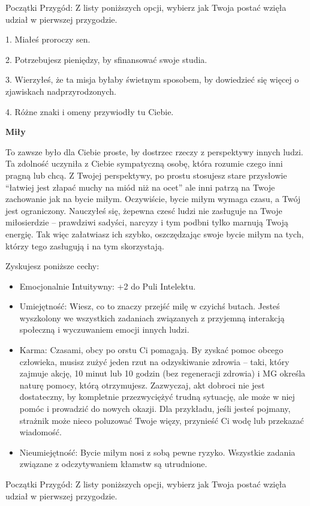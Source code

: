 Początki Przygód: Z listy poniższych opcji, wybierz jak Twoja postać wzięła udział w pierwszej przygodzie.

1. Miałeś proroczy sen.

2. Potrzebujesz pieniędzy, by sfinansować swoje studia.

3. Wierzyłeś, że ta misja byłaby świetnym sposobem, by dowiedzieć się więcej o zjawiskach nadprzyrodzonych.

4. Różne znaki i omeny przywiodły tu Ciebie.

\textbf{Miły}

To zawsze było dla Ciebie proste, by dostrzec rzeczy z perspektywy innych ludzi. Ta zdolność uczyniła z Ciebie sympatyczną osobę, która rozumie czego inni pragną lub chcą. Z Twojej perspektywy, po prostu stosujesz stare przysłowie “łatwiej jest złapać muchy na miód niż na ocet” ale inni patrzą na Twoje zachowanie jak na bycie miłym. Oczywiście, bycie miłym wymaga czasu, a Twój jest ograniczony. Nauczyłeś się, żepewna czesć ludzi nie zasługuje na Twoje miłosierdzie – prawdziwi sadyści, narcyzy i tym podbni tylko marnują Twoją energię. Tak więc załatwiasz ich szybko, oszczędzając swoje bycie miłym na tych, którzy tego zasługują i na tym skorzystają. 

Zyskujesz poniższe cechy:
\begin{itemize}
\item  Emocjonalnie Intuitywny: +2 do Puli Intelektu.
\item Umiejętność: Wiesz, co to znaczy przejść milę w czyichś butach. Jesteś wyszkolony we wszystkich zadaniach związanych z przyjemną interakcją społeczną i wyczuwaniem emocji innych ludzi.
\item Karma: Czasami, obcy po orstu Ci pomagają. By zyskać pomoc obcego człowieka, musisz zużyć jeden rzut na odzyskiwanie zdrowia – taki, który zajmuje akcję, 10 minut lub 10 godzin (bez regeneracji zdrowia) i MG określa naturę pomocy, którą otrzymujesz. Zazwyczaj, akt dobroci nie jest dostateczny, by kompletnie przezwyciężyć trudną sytuację, ale może w niej pomóc i prowadzić do nowych okazji. Dla przykładu, jeśli jesteś pojmany, strażnik może nieco poluzować Twoje więzy, przynieść Ci wodę lub przekazać wiadomość.
\item Nieumiejętność: Bycie miłym nosi z sobą pewne ryzyko. Wszystkie zadania związane z odczytywaniem kłamstw są utrudnione. 
\end{itemize}    
    
Początki Przygód: Z listy poniższych opcji, wybierz jak Twoja postać wzięła udział w pierwszej przygodzie.

